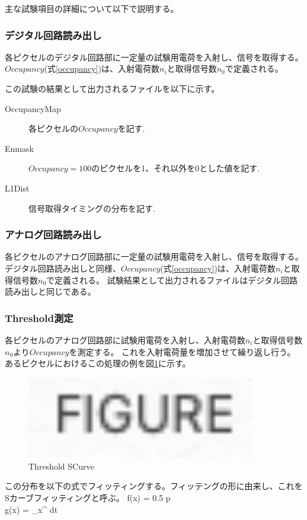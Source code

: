 \clearpage
主な試験項目の詳細について以下で説明する。

\subsubsection{デジタル回路読み出し}
各ピクセルのデジタル回路部に一定量の試験用電荷を入射し、信号を取得する。
$Occupancy$(式\ref{occupancy})は、入射電荷数$n_i$と取得信号数$n_0$で定義される。

この試験の結果として出力されるファイルを以下に示す。
\begin{description}
  \item [OccupancyMap] 各ピクセルの$Occupancy$を記す.
  \item [Enmask] $Occupancy=100$のピクセルを1、それ以外を0とした値を記す.
  \item [L1Dist] 信号取得タイミングの分布を記す.
\end{description}

\subsubsection{アナログ回路読み出し}
各ピクセルのアナログ回路部に一定量の試験用電荷を入射し、信号を取得する。
デジタル回路読み出しと同様、$Occupancy$(式\ref{occupancy})は、入射電荷数$n_i$と取得信号数$n_0$で定義される。
試験結果として出力されるファイルはデジタル回路読み出しと同じである。

\subsubsection{Threshold測定}
各ピクセルのアナログ回路部に試験用電荷を入射し、入射電荷数$n_i$と取得信号数$n_0$より$Occupancy$を測定する。
これを入射電荷量を増加させて繰り返し行う。
あるピクセルにおけるこの処理の例を図\ref{threshold_scurve}に示す。
\begin{figure}[bpt]\centering
\includegraphics[width=10cm]{figure}
\caption[Threshold SCurve]{Threshold SCurve}
\label{threshold_scurve}
\end{figure}

この分布を以下の式でフィッティングする。フィッテングの形に由来し、これをSカーブフィッティングと呼ぶ。
\bbb
f(x) = 0.5 \times {} \times p\\
g(x) =  \int_x^ {\rm d}t
\eee


